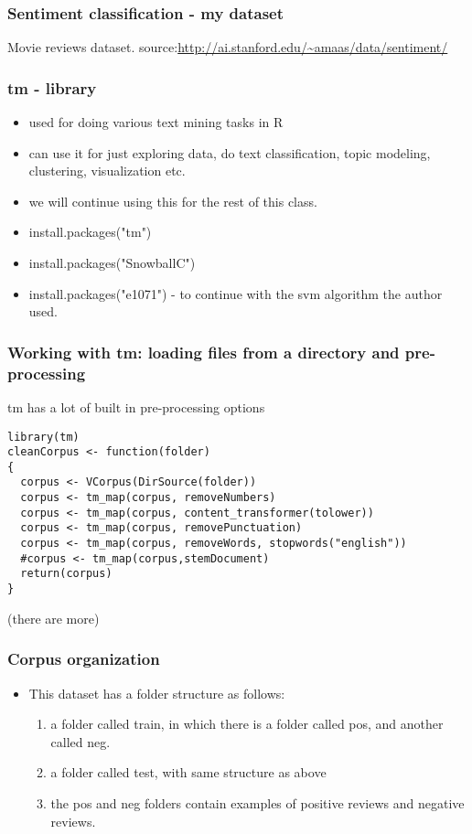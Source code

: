 \documentclass{beamer}
\begin{document}
\begin{frame}
\frametitle{Sentiment classification - my dataset}
Movie reviews dataset. 
source:\url{http://ai.stanford.edu/~amaas/data/sentiment/}
\end{frame}

\begin{frame}
\frametitle{tm - library}
\begin{itemize}
\item used for doing various text mining tasks in R
\item can use it for just exploring data, do text classification, topic modeling, clustering, visualization etc.
\item we will continue using this for the rest of this class.
\item install.packages("tm")
\item install.packages("SnowballC")
\item install.packages("e1071") - to continue with the svm algorithm the author used.
\end{itemize}
\end{frame}

\begin{frame}[fragile]
\frametitle{Working with tm: loading files from a directory and pre-processing}
tm has a lot of built in pre-processing options
\small
\begin{verbatim}
library(tm)
cleanCorpus <- function(folder)
{
  corpus <- VCorpus(DirSource(folder))
  corpus <- tm_map(corpus, removeNumbers)
  corpus <- tm_map(corpus, content_transformer(tolower))
  corpus <- tm_map(corpus, removePunctuation)
  corpus <- tm_map(corpus, removeWords, stopwords("english"))
  #corpus <- tm_map(corpus,stemDocument)
  return(corpus)
}
\end{verbatim}
(there are more)
\end{frame}

\begin{frame}[fragile]
\frametitle{Corpus organization}
\begin{itemize}
\item This dataset has a folder structure as follows:
\begin{enumerate}
\item a folder called train, in which there is a folder called pos, and another called neg.
\item a folder called test, with same structure as above
\item the pos and neg folders contain examples of positive reviews and negative reviews. 
\end{enumerate}
\end{itemize}
\end{frame}
\end{document}
